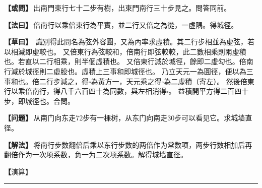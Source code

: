 \documentclass[11pt,a4paper]{article}
\let\origsquare\square
\renewcommand{\square}{\ensuremath{\origsquare}}%
\newcommand{\longline}{\noindent\rule{\textwidth}{0.4pt}}
\newcommand{\clOWEN}[1]{%
  \par\vspace{0.3em}%
  \noindent\textcolor{problemcolor}{\textbf{【或問】}}\,{\tradfont #1}\par\nopagebreak%
}
\newcommand{\mdOWEN}[1]{%
  \par\vspace{0.3em}%
  \noindent\textcolor{problemcolor}{\textbf{【问题】}}\,{\modfont #1}\par\nopagebreak%
}
\newcommand{\clFAYUE}[1]{%
  \par\noindent\textcolor{methodcolor}{\textbf{【法曰】}}\,{\tradfont #1}\par\nopagebreak%
}
\newcommand{\mdFAYUE}[1]{%
  \par\noindent\textcolor{methodcolor}{\textbf{【解法】}}\,{\modfont #1}\par\nopagebreak%
}
\newcommand{\clTSAOYUE}[1]{%
  \par\noindent\textcolor{workcolor}{\textbf{【草曰】}}\,{\tradfont #1}\par%
}
\newcommand{\mdTSAOYUE}[1]{%
  \par\noindent\textcolor{workcolor}{\textbf【演算】}}\,{\modfont #1}\par%
\begin{document}
\begin{paracol}{2}

\begin{leftcolumn}
\clOWEN{出南門東行七十二步有樹，出東門南行三十步見之。問答同前。}

\clFAYUE{倍南行以乘倍東行為平實，並二行又倍之為從，一虛隅。得城徑。}

\clTSAOYUE{%
識別得此問名為弦外容圓，又為內率求虛積。其二行步相並為虛弦，若以相減即虛較也。
又倍東行為弦較和，倍南行即弦較較，此二數相乘則兩虛積也。若直以二行相乘，則半個虛積也。
又倍東行減於城徑，餘即二虛勾也。倍南行減於城徑則二虛股也。虛積上三事和即城徑也。
乃立天元一為圓徑，便以為三事和也。倍二行步減之，得$\square$為黃方一，天元乘之得$\square$為二虛積（寄左）。
然後倍東行以乘倍南行，得八千六百四十為同數，與左相消得$\square$。
益積開平方得二百四十步，即城徑也。合問。}
\end{leftcolumn}

\switchcolumn

\begin{rightcolumn}
\mdOWEN{从南门向东走72步有一棵树，从东门向南走30步可以看见它。求城墙直径。}

\mdFAYUE{将南行步数翻倍后乘以东行步数的两倍作为常数项，两步行数相加后再翻倍作为一次项系数，负一为二次项系数。解得城墙直径。}

\mdTSAOYUE{%
辨识得此题名为「弦外容圆」，又为「内率求虚积」。两步行数相加为虚弦，相减则为虚较。
东行步数的两倍为弦较和，南行步数的两倍为弦较较，二者相乘等于两倍虚积。直接以二行相乘则为半个虚积。
以城径减去两倍东行，余数为两倍虚勾；以城径减去两倍南行，余数为两倍虚股。虚积上的三事和即为城径。
设天元一为圆径，即三事和。减去两倍二行步数得$\square$为黄方，乘以天元得$\square$为两倍虚积（寄左）。
然后两倍东行乘以两倍南行得8640为同数，与左式相消得$\square$。
用增积开平方法得240步，即城径。符合所问。}
\end{rightcolumn}

\end{paracol}

\vspace{0.3cm}
\begin{center}\longline\end{center}
\end{document}
